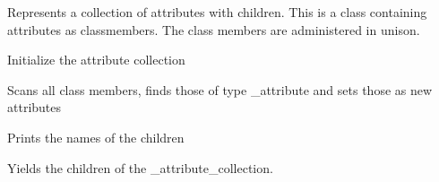 \documentclass[letterpaper,10pt,english]{sphinxmanual}
\begin{document}
\begin{fulllineitems}
\label{\detokenize{autoapi/unduwave/index:unduwave._attribute_collection}}
\pysigstartsignatures
{}
\pysigstopsignatures
\sphinxAtStartPar
Represents a collection of attributes with children.
This is a class containing attributes as class\sphinxhyphen{}members.
The class members are administered in unison.

\sphinxAtStartPar
Initialize the attribute collection

\begin{fulllineitems}
\label{\detokenize{autoapi/unduwave/index:unduwave._attribute_collection._add_attributes}}
\pysigstartsignatures
{}
\pysigstopsignatures
\sphinxAtStartPar
Scans all class members, finds those of type \_attribute and sets those
as new attributes

\end{fulllineitems}


\begin{fulllineitems}
\label{\detokenize{autoapi/unduwave/index:unduwave._attribute_collection.show_all_children}}
\pysigstartsignatures
{}
\pysigstopsignatures
\sphinxAtStartPar
Prints the names of the children

\end{fulllineitems}


\begin{fulllineitems}
\label{\detokenize{autoapi/unduwave/index:unduwave._attribute_collection.children}}
\pysigstartsignatures
{}
\pysigstopsignatures
\sphinxAtStartPar
Yields the children of the \_attribute\_collection.

\end{fulllineitems}


\end{fulllineitems}
\end{document}
